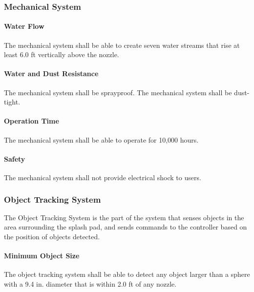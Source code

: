 \subsubsection{Mechanical System}

\paragraph{Water Flow}
The mechanical system shall be able to create seven water streams that rise at least 6.0 ft vertically above the nozzle.

\paragraph{Water and Dust Resistance}
The mechanical system shall be sprayproof. %
The mechanical system shall be dust-tight. %


\paragraph{Operation Time}
The mechanical system shall be able to operate for 10,000 hours. 

\paragraph{Safety}
The mechanical system shall not provide electrical shock to users. 



\subsubsection{Object Tracking System}
The Object Tracking System is the part of the system that senses objects in the area surrounding the splash pad, and sends commands to the controller based on the position of objects detected.

\paragraph{Minimum Object Size}
The object tracking system shall be able to detect any object larger than a sphere with a 9.4 in. diameter that is within 2.0 ft of any nozzle.

